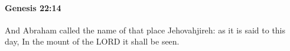 
		\paragraph{Genesis 22:14} %
			\label{GENESIS-22-14}

			And Abraham called the name of that place Jehovahjireh: as it is said to this day, In the mount of the LORD it shall be seen.


